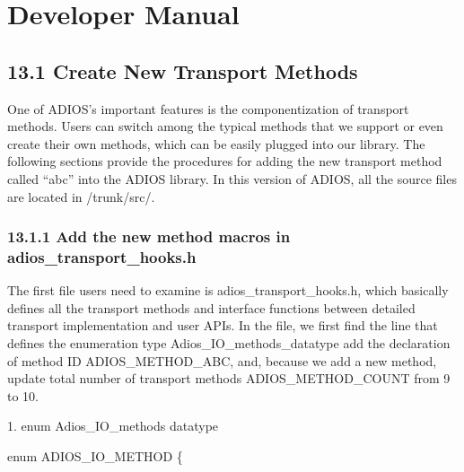 \vspace{36pt}
\section{Developer Manual}

\vspace{37pt}
\subsection*{{\large 13.1 }{\large \textbf{Create New Transport Methods}}}

\vspace{10pt}
One of ADIOS's important features is the componentization of transport methods. 
Users can switch among the typical methods that we support or even create their 
own methods, which can be easily plugged into our library. The following sections 
provide the procedures for adding the new transport method called ``abc'' into 
the ADIOS library. In this version of ADIOS, all the source files are located in 
/trunk/src/.\label{HToc84890312}\label{HToc212016687}\label{HToc212016929}\label{HToc182553454}

\vspace{10pt}
\subsubsection*{{\large \textbf{13.1.1 Add the new method macros in adios\_transport\_hooks.h 
}}}

\vspace{10pt}
The first file users need to examine is adios\_transport\_hooks.h, which basically 
defines all the transport methods and interface functions between detailed transport 
implementation and user APIs. In the file, we first find the line that defines 
the enumeration type Adios\_IO\_methods\_datatype add the declaration of method 
ID ADIOS\_METHOD\_ABC, and, because we add a new method, update total number of 
transport methods ADIOS\_METHOD\_COUNT from 9 to 10.

\vspace{10pt}
1. enum Adios\_IO\_methods datatype 

\vspace{10pt}
enum ADIOS\_IO\_METHOD \{

